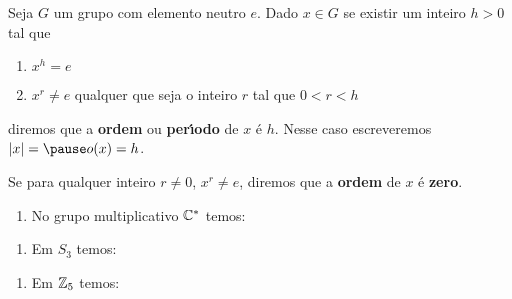 \documentclass{beamer}
\begin{document}
    \begin{frame}
        \begin{definicao}
            Seja $G$ um grupo com elemento neutro $e$. \pause Dado $x \in G$ \pause se existir um inteiro $h > 0$ \pause tal que \pause
            \begin{enumerate}[label={\roman*})]
                \item $x^h = e$ \pause
                \item $x^r \ne e$ \pause qualquer que seja o inteiro $r$ \pause tal que $0 < r < h$\pause
            \end{enumerate}
            diremos que a \textbf{ordem} \pause ou \textbf{per{\'\i}odo} \pause de $x$ \'e $h$. \pause Nesse caso escreveremos $|x| = \pause o(x) = h$. \pause

            Se para qualquer inteiro \pause $r \ne 0$, \pause $x^r \ne e$, \pause diremos que a \textbf{ordem} de $x$ \'e \textbf{zero}.
        \end{definicao}
    \end{frame}

    \begin{frame}
        \begin{exemplos}
            \begin{enumerate}[label={\roman*})]
                \item No grupo multiplicativo $\mathbb{C}^*$ temos:
                \seti
            \end{enumerate}
        \end{exemplos}
    \end{frame}

    \begin{frame}
        \begin{exemplos}
            \begin{enumerate}[label={\roman*})]
                \conti
                \item Em $S_3$ temos:
                \seti
            \end{enumerate}
        \end{exemplos}
    \end{frame}

    \begin{frame}
        \begin{exemplos}
            \begin{enumerate}[label={\roman*})]
                \conti

                \item Em $\mathbb{Z}_5$ temos:
                \seti
            \end{enumerate}
        \end{exemplos}
    \end{frame}
\end{document}
